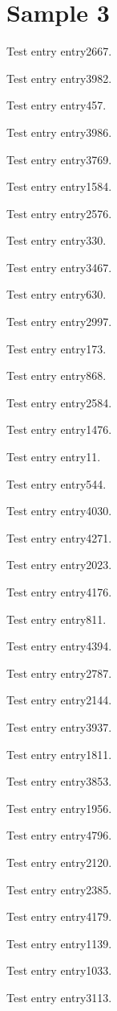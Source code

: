 \chapter{Sample 3}
Test entry \gls{entry2667}.

Test entry \gls{entry3982}.

Test entry \gls{entry457}.

Test entry \gls{entry3986}.

Test entry \gls{entry3769}.

Test entry \gls{entry1584}.

Test entry \gls{entry2576}.

Test entry \gls{entry330}.

Test entry \gls{entry3467}.

Test entry \gls{entry630}.

Test entry \gls{entry2997}.

Test entry \gls{entry173}.

Test entry \gls{entry868}.

Test entry \gls{entry2584}.

Test entry \gls{entry1476}.

Test entry \gls{entry11}.

Test entry \gls{entry544}.

Test entry \gls{entry4030}.

Test entry \gls{entry4271}.

Test entry \gls{entry2023}.

Test entry \gls{entry4176}.

Test entry \gls{entry811}.

Test entry \gls{entry4394}.

Test entry \gls{entry2787}.

Test entry \gls{entry2144}.

Test entry \gls{entry3937}.

Test entry \gls{entry1811}.

Test entry \gls{entry3853}.

Test entry \gls{entry1956}.

Test entry \gls{entry4796}.

Test entry \gls{entry2120}.

Test entry \gls{entry2385}.

Test entry \gls{entry4179}.

Test entry \gls{entry1139}.

Test entry \gls{entry1033}.

Test entry \gls{entry3113}.

